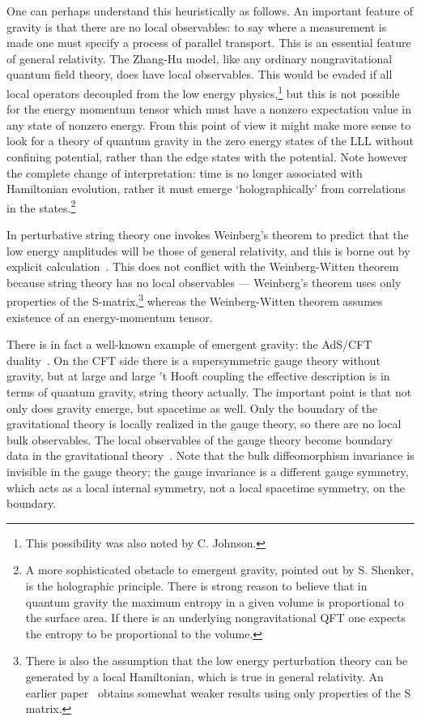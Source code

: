\documentclass[a4paper,12pt]{article}
\begin{document}
One can perhaps understand this heuristically as follows.  An important
feature of gravity is that there are no local observables: to say where a
measurement is made one must specify a process of parallel transport.  This
is an essential feature of general relativity.  The Zhang-Hu model, like any
ordinary nongravitational quantum field theory, does have local 
observables. 
This would be evaded if all local operators decoupled from the low energy
physics,\footnote{This possibility was also noted by C. Johnson.} but this is
not possible for the energy momentum tensor which must have a nonzero
expectation value in any state of nonzero energy.  From this point of
view it might make more sense to look for a theory of quantum gravity in the
zero energy states of the LLL without confining potential, rather than the
edge states with the potential.  Note however the complete change of
interpretation: time is no longer associated with Hamiltonian evolution, 
rather it must emerge `holographically' from correlations in the
states.\footnote{A more sophisticated obstacle to emergent gravity, pointed
out by S. Shenker, is the holographic principle.  There is strong reason to
believe that in quantum gravity the maximum entropy in a given volume is
proportional to the surface area.  If there is an underlying nongravitational
QFT one expects the entropy to be proportional to the volume.}

In perturbative string
theory one invokes Weinberg's theorem to predict that the low energy amplitudes
will be those of general relativity, and this is borne out by explicit
calculation~\cite{scherk}.  This does not conflict with the Weinberg-Witten
theorem because string theory has no local observables --- Weinberg's theorem
uses only properties of the S-matrix,\footnote{There is also the assumption
that the low energy perturbation theory can be generated by a local
Hamiltonian, which is true in general relativity.  An earlier
paper~\cite{earlier} obtains somewhat weaker results using only properties of
the S matrix.} whereas the Weinberg-Witten theorem assumes existence
of an energy-momentum tensor.

There is in fact a well-known example of emergent gravity: the AdS/CFT
duality~\cite{malda}.  On the CFT side there is a supersymmetric gauge theory
without gravity, but at large \coordHE{} and large 't Hooft coupling the effective
description is in terms of quantum gravity, string theory actually.  The
important point is that not only does gravity emerge, but spacetime as well. 
Only the boundary of the gravitational theory is locally realized in the gauge
theory, so there are no local bulk observables.  The local observables of the
gauge theory become boundary data in the gravitational theory~\cite{GKPW}.
Note that the bulk diffeomorphism invariance is invisible in the gauge
theory; the \coordHE{} gauge invariance is a different gauge symmetry, which
acts as a local internal symmetry, not a local spacetime symmetry, on the
boundary.
\end{document}
